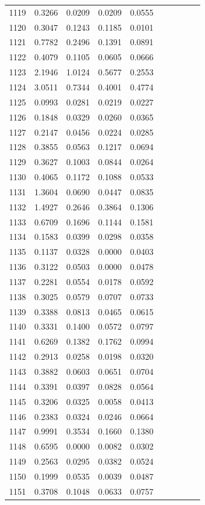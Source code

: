 \begin{table}
\begin{tabular}{cccccccccc}
1119& 0.3266& 0.0209& 0.0209& 0.0555\\ 
1120& 0.3047& 0.1243& 0.1185& 0.0101\\ 
1121& 0.7782& 0.2496& 0.1391& 0.0891\\ 
1122& 0.4079& 0.1105& 0.0605& 0.0666\\ 
1123& 2.1946& 1.0124& 0.5677& 0.2553\\ 
1124& 3.0511& 0.7344& 0.4001& 0.4774\\ 
1125& 0.0993& 0.0281& 0.0219& 0.0227\\ 
1126& 0.1848& 0.0329& 0.0260& 0.0365\\ 
1127& 0.2147& 0.0456& 0.0224& 0.0285\\ 
1128& 0.3855& 0.0563& 0.1217& 0.0694\\ 
1129& 0.3627& 0.1003& 0.0844& 0.0264\\ 
1130& 0.4065& 0.1172& 0.1088& 0.0533\\ 
1131& 1.3604& 0.0690& 0.0447& 0.0835\\ 
1132& 1.4927& 0.2646& 0.3864& 0.1306\\ 
1133& 0.6709& 0.1696& 0.1144& 0.1581\\ 
1134& 0.1583& 0.0399& 0.0298& 0.0358\\ 
1135& 0.1137& 0.0328& 0.0000& 0.0403\\ 
1136& 0.3122& 0.0503& 0.0000& 0.0478\\ 
1137& 0.2281& 0.0554& 0.0178& 0.0592\\ 
1138& 0.3025& 0.0579& 0.0707& 0.0733\\ 
1139& 0.3388& 0.0813& 0.0465& 0.0615\\ 
1140& 0.3331& 0.1400& 0.0572& 0.0797\\ 
1141& 0.6269& 0.1382& 0.1762& 0.0994\\ 
1142& 0.2913& 0.0258& 0.0198& 0.0320\\ 
1143& 0.3882& 0.0603& 0.0651& 0.0704\\ 
1144& 0.3391& 0.0397& 0.0828& 0.0564\\ 
1145& 0.3206& 0.0325& 0.0058& 0.0413\\ 
1146& 0.2383& 0.0324& 0.0246& 0.0664\\ 
1147& 0.9991& 0.3534& 0.1660& 0.1380\\ 
1148& 0.6595& 0.0000& 0.0082& 0.0302\\ 
1149& 0.2563& 0.0295& 0.0382& 0.0524\\ 
1150& 0.1999& 0.0535& 0.0039& 0.0487\\ 
1151& 0.3708& 0.1048& 0.0633& 0.0757\\ 

\end{tabular}
\end{table}
